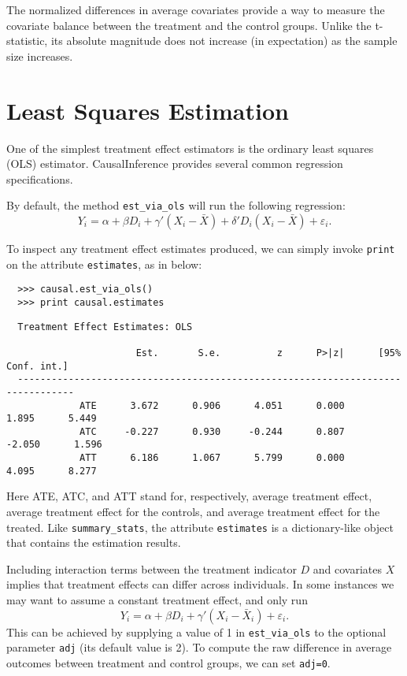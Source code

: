 \documentclass[12pt]{article}
\theoremstyle{definition}
\theoremstyle{definition}
\theoremstyle{definition}
\theoremstyle{remark}
\begin{document}
The normalized differences in average covariates provide a way to measure the covariate balance between the treatment and the control groups. Unlike the t-statistic, its absolute magnitude does not increase (in expectation) as the sample size increases.


\section{Least Squares Estimation}

One of the simplest treatment effect estimators is the ordinary least squares (OLS) estimator. CausalInference provides several common regression specifications.

By default, the method \texttt{est\_via\_ols} will run the following regression:
\[Y_i = \alpha + \beta D_i + \gamma' (X_i-\bar{X}) + \delta' D_i (X_i-\bar{X}) + \varepsilon_i.\]

To inspect any treatment effect estimates produced, we can simply invoke \texttt{print} on the attribute \texttt{estimates}, as in below:
\begin{verbatim}
  >>> causal.est_via_ols()
  >>> print causal.estimates
\end{verbatim}
\begin{verbatim}
  Treatment Effect Estimates: OLS
  
                       Est.       S.e.          z      P>|z|      [95% Conf. int.]
  --------------------------------------------------------------------------------
             ATE      3.672      0.906      4.051      0.000      1.895      5.449
             ATC     -0.227      0.930     -0.244      0.807     -2.050      1.596
             ATT      6.186      1.067      5.799      0.000      4.095      8.277
\end{verbatim}
Here ATE, ATC, and ATT stand for, respectively, average treatment effect, average treatment effect for the controls, and average treatment effect for the treated. Like \texttt{summary\_stats}, the attribute \texttt{estimates} is a dictionary-like object that contains the estimation results.

Including interaction terms between the treatment indicator $D$ and covariates $X$ implies that treatment effects can differ across individuals. In some instances we may want to assume a constant treatment effect, and only run
\[Y_i = \alpha + \beta D_i + \gamma' (X_i-\bar{X}_i) + \varepsilon_i.\]
This can be achieved by supplying a value of 1 in \texttt{est\_via\_ols} to the optional parameter \texttt{adj} (its default value is 2). To compute the raw difference in average outcomes between treatment and control groups, we can set \texttt{adj=0}.
\end{document}
